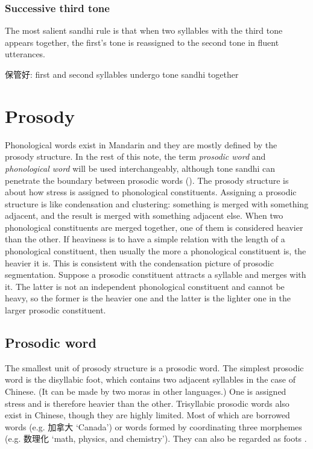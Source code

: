 \documentclass[UTF8, a4paper, oneside, scheme=plain, 12pt]{ctexrep}
\newcommand*{\citesec}[1]{\S~{#1}}
\newcommand*{\term}[1]{\emph{#1}}
\newcommand{\translate}[1]{`#1'}
\begin{document}
\subsubsection{Successive third tone}\label{sec:phonology.tone-sandhi.third}

The most salient sandhi rule is that 
when two syllables with the third tone appears together, 
the first's tone is reassigned to the second tone in 
fluent utterances. 

保管好: first and second syllables undergo tone sandhi together 

\section{Prosody}\label{sec:prosody-structure}

Phonological words exist in Mandarin 
and they are mostly defined by the prosody structure.
In the rest of this note,
the term \term{prosodic word} and \term{phonological word}
will be used interchangeably, 
although tone sandhi can penetrate 
the boundary between prosodic words
().
The prosody structure is about how stress is assigned to phonological constituents.
Assigning a prosodic structure is like condensation and clustering:
something is merged with something adjacent,
and the result is merged with something adjacent else.
When two phonological constituents are merged together,
one of them is considered heavier than the other.
If heaviness is to have a simple relation with the length of a phonological constituent,
then usually the more a phonological constituent is,
the heavier it is.
This is consistent with the condensation picture of prosodic segmentation.
Suppose a prosodic constituent attracts a syllable and merges with it.
The latter is not an independent phonological constituent
and cannot be heavy,
so the former is the heavier one and the latter is the lighter one in the larger prosodic constituent.

\subsection{Prosodic word}

The smallest unit of prosody structure 
is a prosodic word.
The simplest prosodic word is the disyllabic foot, 
which contains two adjacent syllables in the case of Chinese.
(It can be made by two moras in other languages.)
One is assigned stress and is therefore heavier than the other.
Trisyllabic prosodic words also exist in Chinese,
though they are highly limited.
Most of which are borrowed words (e.g. 加拿大 \translate{Canada})
or words formed by coordinating three morphemes (e.g. 数理化 \translate{math, physics, and chemistry}).
They can also be regarded as foots \citep[\citesec{2.2}]{feng2000}.
\end{document}
